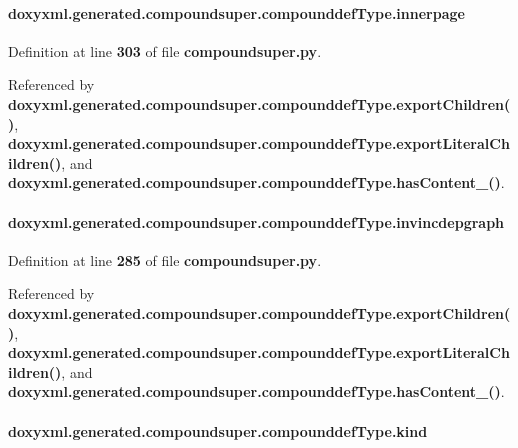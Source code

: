 \paragraph[{innerpage}]{\setlength{\rightskip}{0pt plus 5cm}doxyxml.\+generated.\+compoundsuper.\+compounddef\+Type.\+innerpage}\label{classdoxyxml_1_1generated_1_1compoundsuper_1_1compounddefType_ae8f1123318248f2a8e1ac27627d4833b}


Definition at line {\bf 303} of file {\bf compoundsuper.\+py}.



Referenced by {\bf doxyxml.\+generated.\+compoundsuper.\+compounddef\+Type.\+export\+Children()}, {\bf doxyxml.\+generated.\+compoundsuper.\+compounddef\+Type.\+export\+Literal\+Children()}, and {\bf doxyxml.\+generated.\+compoundsuper.\+compounddef\+Type.\+has\+Content\+\_\+()}.

\paragraph[{invincdepgraph}]{\setlength{\rightskip}{0pt plus 5cm}doxyxml.\+generated.\+compoundsuper.\+compounddef\+Type.\+invincdepgraph}\label{classdoxyxml_1_1generated_1_1compoundsuper_1_1compounddefType_ad3ce24e2e14f763b96c36f7f98e83944}


Definition at line {\bf 285} of file {\bf compoundsuper.\+py}.



Referenced by {\bf doxyxml.\+generated.\+compoundsuper.\+compounddef\+Type.\+export\+Children()}, {\bf doxyxml.\+generated.\+compoundsuper.\+compounddef\+Type.\+export\+Literal\+Children()}, and {\bf doxyxml.\+generated.\+compoundsuper.\+compounddef\+Type.\+has\+Content\+\_\+()}.

\paragraph[{kind}]{\setlength{\rightskip}{0pt plus 5cm}doxyxml.\+generated.\+compoundsuper.\+compounddef\+Type.\+kind}\label{classdoxyxml_1_1generated_1_1compoundsuper_1_1compounddefType_a7fb4cc29cf62e8a6b41fbc5766166ce8}


